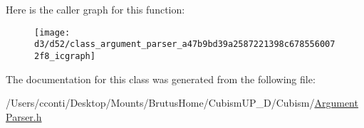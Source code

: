 Here is the caller graph for this function\+:
\nopagebreak
\begin{figure}[H]
\begin{center}
\leavevmode
\texttt{[image: d3/d52/class\_argument\_parser\_a47b9bd39a2587221398c6785560072f8\_icgraph]}
\end{center}
\end{figure}




The documentation for this class was generated from the following file\+:\begin{DoxyCompactItemize}
\item 
/\+Users/cconti/\+Desktop/\+Mounts/\+Brutus\+Home/\+Cubism\+U\+P\+\_\+D/\+Cubism/\hyperlink{_argument_parser_8h}{Argument\+Parser.\+h}\end{DoxyCompactItemize}
